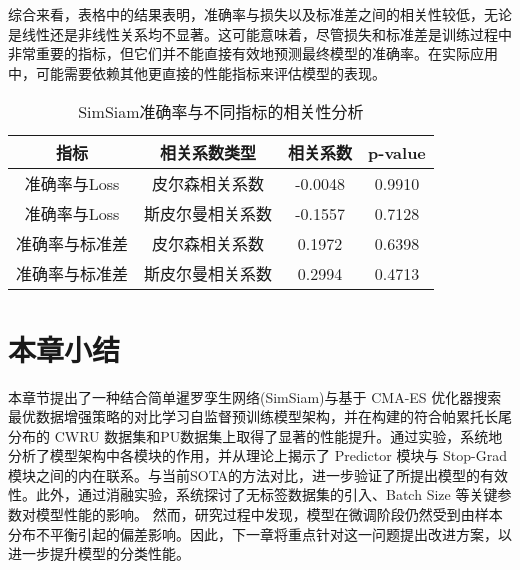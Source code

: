 \documentclass[master]{thesis-uestc}
\begin{document}
综合来看，表格中的结果表明，准确率与损失以及标准差之间的相关性较低，无论是线性还是非线性关系均不显著。这可能意味着，尽管损失和标准差是训练过程中非常重要的指标，但它们并不能直接有效地预测最终模型的准确率。在实际应用中，可能需要依赖其他更直接的性能指标来评估模型的表现。

\begin{table}[h]
    \centering
    \caption{SimSiam准确率与不同指标的相关性分析}
    \begin{tabular}{cccc}
    \toprule
    \textbf{指标} & \textbf{相关系数类型} & \textbf{相关系数} & \textbf{p-value} \\
    \midrule
    准确率与Loss     & 皮尔森相关系数   & -0.0048 & 0.9910 \\
    准确率与Loss     & 斯皮尔曼相关系数 & -0.1557 & 0.7128 \\
    准确率与标准差      & 皮尔森相关系数   & 0.1972 & 0.6398 \\
    准确率与标准差      & 斯皮尔曼相关系数 & 0.2994 & 0.4713 \\
    \bottomrule
    \end{tabular}
    \label{tab:correlation_with_acc}
    \end{table}
\FloatBarrier  %
\section{本章小结}
本章节提出了一种结合简单暹罗孪生网络(SimSiam)与基于 CMA-ES 优化器搜索最优数据增强策略的对比学习自监督预训练模型架构，并在构建的符合帕累托长尾分布的 CWRU 数据集和PU数据集上取得了显著的性能提升。通过实验，系统地分析了模型架构中各模块的作用，并从理论上揭示了 Predictor 模块与 Stop-Grad 模块之间的内在联系。与当前SOTA的方法对比，进一步验证了所提出模型的有效性。此外，通过消融实验，系统探讨了无标签数据集的引入、Batch Size 等关键参数对模型性能的影响。
然而，研究过程中发现，模型在微调阶段仍然受到由样本分布不平衡引起的偏差影响。因此，下一章将重点针对这一问题提出改进方案，以进一步提升模型的分类性能。
\end{document}
